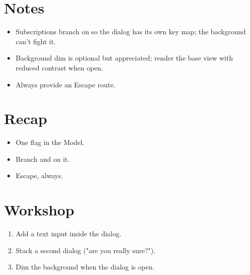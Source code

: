 \section{Notes}

\begin{itemize}[leftmargin=*]
  \item Subscriptions branch on  so the dialog
    has its own key map; the background can't fight it.
  \item Background dim is optional but appreciated; render
    the base view with reduced contrast when open.
  \item Always provide an Escape route.
\end{itemize}

\section{Recap}

\begin{recap}
\begin{itemize}[leftmargin=*]
  \item One flag in the Model.
  \item Branch  and  on it.
  \item Escape, always.
\end{itemize}
\end{recap}

\section*{Workshop}

\begin{enumerate}[leftmargin=*]
  \item Add a text input inside the dialog.
  \item Stack a second dialog ("are you really sure?").
  \item Dim the background when the dialog is open.
\end{enumerate}
